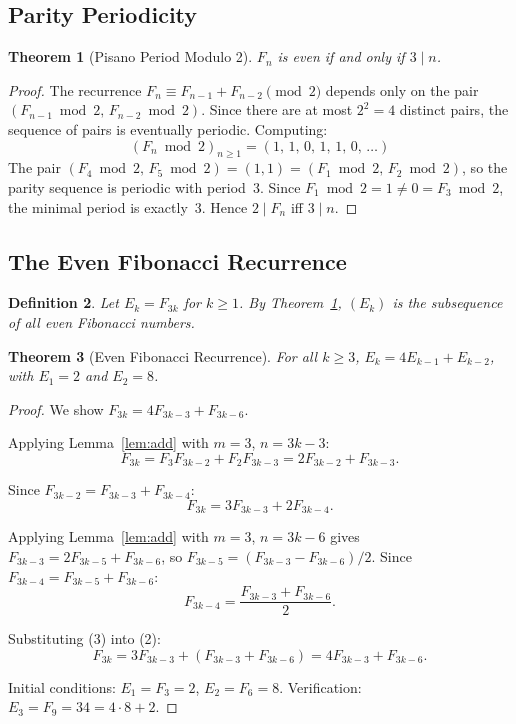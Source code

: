 \documentclass[11pt]{article}
\newtheorem{theorem}{Theorem}
\newtheorem{definition}[theorem]{Definition}
\begin{document}
\subsection{Parity Periodicity}

\begin{theorem}[Pisano Period Modulo 2]
\label{thm:parity}
$F_n$ is even if and only if $3 \mid n$.
\end{theorem}

\begin{proof}
The recurrence $F_n \equiv F_{n-1} + F_{n-2} \pmod{2}$ depends only on the pair $(F_{n-1} \bmod 2,\, F_{n-2} \bmod 2)$. Since there are at most $2^2 = 4$ distinct pairs, the sequence of pairs is eventually periodic. Computing:
\[
(F_n \bmod 2)_{n \ge 1} = (1,\, 1,\, 0,\, 1,\, 1,\, 0,\, \ldots)
\]
The pair $(F_4 \bmod 2,\, F_5 \bmod 2) = (1,1) = (F_1 \bmod 2,\, F_2 \bmod 2)$, so the parity sequence is periodic with period~3. Since $F_1 \bmod 2 = 1 \ne 0 = F_3 \bmod 2$, the minimal period is exactly~3. Hence $2 \mid F_n$ iff $3 \mid n$.
\end{proof}

\subsection{The Even Fibonacci Recurrence}

\begin{definition}
Let $E_k = F_{3k}$ for $k \ge 1$. By Theorem~\ref{thm:parity}, $(E_k)$ is the subsequence of all even Fibonacci numbers.
\end{definition}

\begin{theorem}[Even Fibonacci Recurrence]
\label{thm:recurrence}
For all $k \ge 3$, $E_k = 4E_{k-1} + E_{k-2}$, with $E_1 = 2$ and $E_2 = 8$.
\end{theorem}

\begin{proof}
We show $F_{3k} = 4F_{3k-3} + F_{3k-6}$.

Applying Lemma~\ref{lem:add} with $m=3$, $n=3k-3$:
\begin{equation}
F_{3k} = F_3 F_{3k-2} + F_2 F_{3k-3} = 2F_{3k-2} + F_{3k-3}. \tag{1}
\end{equation}

Since $F_{3k-2} = F_{3k-3} + F_{3k-4}$:
\begin{equation}
F_{3k} = 3F_{3k-3} + 2F_{3k-4}. \tag{2}
\end{equation}

Applying Lemma~\ref{lem:add} with $m=3$, $n=3k-6$ gives $F_{3k-3} = 2F_{3k-5} + F_{3k-6}$, so $F_{3k-5} = (F_{3k-3} - F_{3k-6})/2$. Since $F_{3k-4} = F_{3k-5} + F_{3k-6}$:
\begin{equation}
F_{3k-4} = \frac{F_{3k-3} + F_{3k-6}}{2}. \tag{3}
\end{equation}

Substituting (3) into (2):
\[
F_{3k} = 3F_{3k-3} + (F_{3k-3} + F_{3k-6}) = 4F_{3k-3} + F_{3k-6}.
\]

Initial conditions: $E_1 = F_3 = 2$, $E_2 = F_6 = 8$. Verification: $E_3 = F_9 = 34 = 4 \cdot 8 + 2$.
\end{proof}
\end{document}
